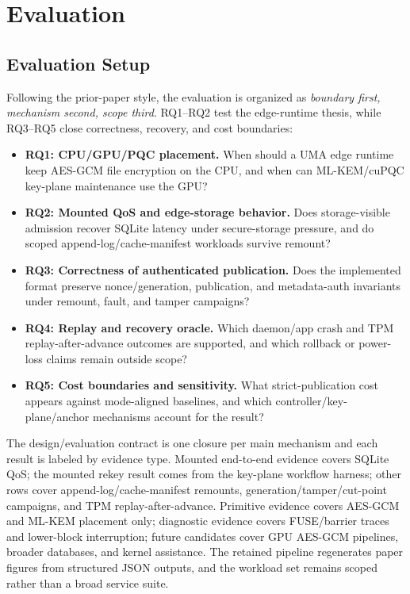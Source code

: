 \section{Evaluation}
\label{sec:evaluation}

\subsection{Evaluation Setup}
\label{sec:eval_setup}

Following the prior-paper style, the evaluation is organized as \emph{boundary first, mechanism second, scope third}.  RQ1--RQ2 test the edge-runtime thesis, while RQ3--RQ5 close correctness, recovery, and cost boundaries:
\begin{itemize}
  \item \textbf{RQ1: CPU/GPU/PQC placement.} When should a UMA edge runtime keep AES-GCM file encryption on the CPU, and when can ML-KEM/cuPQC key-plane maintenance use the GPU?
  \item \textbf{RQ2: Mounted QoS and edge-storage behavior.} Does storage-visible admission recover SQLite latency under secure-storage pressure, and do scoped append-log/cache-manifest workloads survive remount?
  \item \textbf{RQ3: Correctness of authenticated publication.} Does the implemented format preserve nonce/generation, publication, and metadata-auth invariants under remount, fault, and tamper campaigns?
  \item \textbf{RQ4: Replay and recovery oracle.} Which daemon/app crash and TPM replay-after-advance outcomes are supported, and which rollback or power-loss claims remain outside scope?
  \item \textbf{RQ5: Cost boundaries and sensitivity.} What strict-publication cost appears against mode-aligned baselines, and which controller/key-plane/anchor mechanisms account for the result?
\end{itemize}

The design/evaluation contract is one closure per main mechanism and each result is labeled by evidence type.  Mounted end-to-end evidence covers SQLite QoS; the mounted rekey result comes from the key-plane workflow harness; other rows cover append-log/cache-manifest remounts, generation/tamper/cut-point campaigns, and TPM replay-after-advance.  Primitive evidence covers AES-GCM and ML-KEM placement only; diagnostic evidence covers FUSE/barrier traces and lower-block interruption; future candidates cover GPU AES-GCM pipelines, broader databases, and kernel assistance.  The retained pipeline regenerates paper figures from structured JSON outputs, and the workload set remains scoped rather than a broad service suite.

